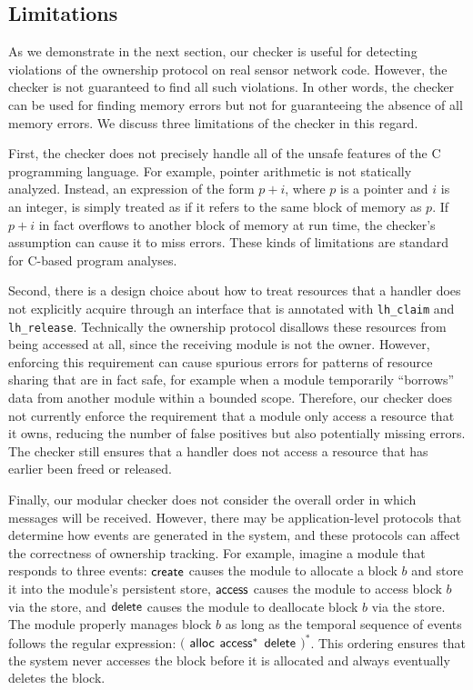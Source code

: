 \subsection{Limitations}

As we demonstrate in the next section, our checker is useful for
detecting violations of the ownership protocol on real sensor network
code.  However, the checker is not guaranteed to find all such
violations.  In other words, the checker can be used for finding
memory errors but not for guaranteeing the absence of all memory
errors.  We discuss three limitations of the checker in this regard.

First, the checker does not precisely handle all of the unsafe
features of the C programming language.  For example, pointer
arithmetic is not statically analyzed.  Instead, an expression of the
form $p+i$, where $p$ is a pointer and $i$ is an integer, is simply
treated as if it refers to the same block of memory as $p$.  If $p+i$
in fact overflows to another block of memory at run time, the
checker's assumption can cause it to miss errors.  These kinds of
limitations are standard for C-based program analyses.

Second, there is a design choice about how to treat resources that a
handler does not explicitly acquire through an interface that is
annotated with {\tt lh\_claim} and {\tt lh\_release}.  Technically the
ownership protocol disallows these resources from being accessed at
all, since the receiving module is not the owner.  However, enforcing
this requirement can cause spurious errors for patterns of resource
sharing that are in fact safe, for example when a module temporarily
``borrows'' data from another module within a bounded scope.
Therefore, our checker does not currently enforce the requirement that
a module only access a resource that it owns, reducing the number of
false positives but also potentially missing errors.  The checker
still ensures that a handler does not access a resource that has
earlier been freed or released.

Finally, our modular checker does not consider the overall order in
which messages will be received.  However, there may be
application-level protocols that determine how events are generated in
the system, and these protocols can affect the correctness of
ownership tracking.
%
For example, imagine a module that responds to three events: ${\mathsf{create}}$
causes the module to allocate a block $b$ and store it into the
module's persistent store, ${\mathsf{access}}$ causes the module to access block
$b$ via the  store, and ${\mathsf{delete}}$ causes the module to deallocate
block $b$ via the store.  The module properly manages block $b$ as
long as the temporal sequence of events follows the regular expression:
$($ ${\mathsf{alloc}}$ ${\mathsf{access}}^*$ ${\mathsf{delete}}$ $)^*$.  This ordering ensures that the system
never accesses the block before it is allocated and always eventually
deletes the block.

